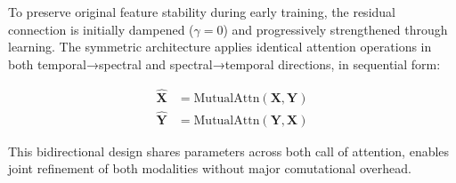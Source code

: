 \documentclass[conference]{IEEEtran}
\begin{document}
To preserve original feature stability during early training, the residual connection is initially dampened ($\gamma=0$) and progressively strengthened through learning. The symmetric architecture applies identical attention operations in both temporal→spectral and spectral→temporal directions, in sequential form:

\begin{equation}
    \begin{aligned}
        \mathbf{\widehat{X}} & = \text{MutualAttn}(\mathbf{X}, \mathbf{Y}) \\
        \mathbf{\widehat{Y}} & = \text{MutualAttn}(\mathbf{Y}, \mathbf{X})
    \end{aligned}
\end{equation}

This bidirectional design shares parameters across both call of attention, enables joint refinement of both modalities without major comutational overhead.






\end{document}
